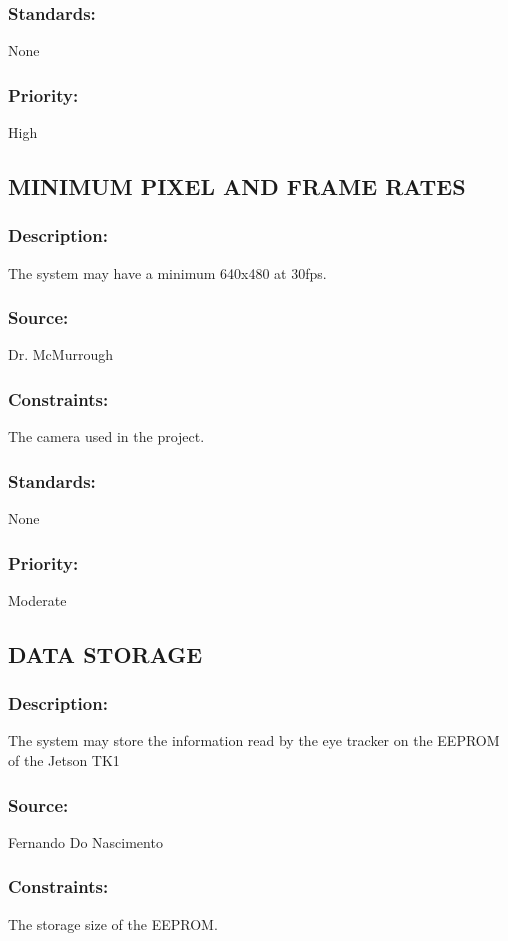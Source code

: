 \subsubsection{Standards:} 
	{None}
\subsubsection{Priority:} 
	{High}
\newline
	
\subsection{\text MINIMUM PIXEL AND FRAME RATES }
\subsubsection{Description:} 
	{The system may have a minimum 640x480 at 30fps.}
\subsubsection{Source:}
	{Dr. McMurrough}
\subsubsection{Constraints:} 
	{The camera used in the project.}
\subsubsection{Standards:} 
	{None}
\subsubsection{Priority:} 
	{Moderate}
\newline
	
\subsection{\text DATA STORAGE}
\subsubsection{Description:} 
	{The system may store the information read by the eye tracker on the EEPROM of the Jetson TK1}
\subsubsection{Source:} 
	{Fernando Do Nascimento}
\subsubsection{Constraints:} 
	{The storage size of the EEPROM.}
